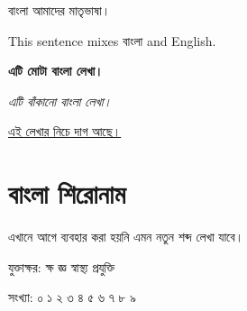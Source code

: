 \documentclass[12pt]{article}
\begin{document}
বাংলা আমাদের মাতৃভাষা।

This sentence mixes বাংলা and English.

\textbf{এটি মোটা বাংলা লেখা।}

\textit{এটি বাঁকানো বাংলা লেখা।}

\underline{এই লেখার নিচে দাগ আছে।}

\section{বাংলা শিরোনাম}

এখানে আগে ব্যবহার করা হয়নি এমন নতুন শব্দ লেখা যাবে।

যুক্তাক্ষর: ক্ষ জ্ঞ স্বাস্থ্য প্রযুক্তি

সংখ্যা: ০ ১ ২ ৩ ৪ ৫ ৬ ৭ ৮ ৯
\end{document}
